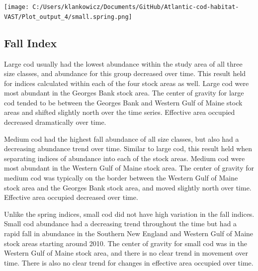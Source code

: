\documentclass[
]{article}
\let\origfigure\figure
\let\endorigfigure\endfigure
\renewenvironment{figure}[1][2] {
    \expandafter\origfigure\expandafter[H]
} {
    \endorigfigure
}
\begin{document}
\begin{figure}
\centering
\texttt{[image: C:/Users/klankowicz/Documents/GitHub/Atlantic-cod-habitat-VAST/Plot\_output\_4/small.spring.png]}
\caption{Figure 15: Small cod center of gravity and effective area occupied for all stock areas, spring seasons 1982 - 2021.}
\end{figure}

\hypertarget{fall-index}{%
\subsection{Fall Index}\label{fall-index}}

Large cod usually had the lowest abundance within the study area of all three size classes, and abundance for this group decreased over time. This result held for indices calculated within each of the four stock areas as well. Large cod were most abundant in the Georges Bank stock area. The center of gravity for large cod tended to be between the Georges Bank and Western Gulf of Maine stock areas and shifted slightly north over the time series. Effective area occupied decreased dramatically over time.

Medium cod had the highest fall abundance of all size classes, but also had a decreasing abundance trend over time. Similar to large cod, this result held when separating indices of abundance into each of the stock areas. Medium cod were most abundant in the Western Gulf of Maine stock area. The center of gravity for medium cod was typically on the border between the Western Gulf of Maine stock area and the Georges Bank stock area, and moved slightly north over time. Effective area occupied decreased over time.

Unlike the spring indices, small cod did not have high variation in the fall indices. Small cod abundance had a decreasing trend throughout the time but had a rapid fall in abundance in the Southern New England and Western Gulf of Maine stock areas starting around 2010. The center of gravity for small cod was in the Western Gulf of Maine stock area, and there is no clear trend in movement over time. There is also no clear trend for changes in effective area occupied over time.
\end{document}
